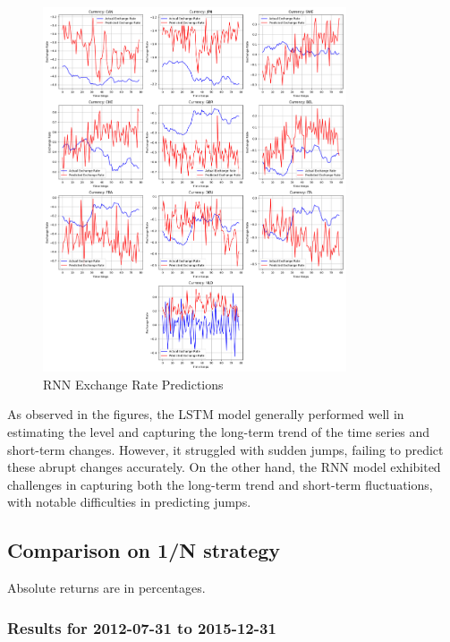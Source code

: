 \documentclass[a4paper,10pt]{article}
\begin{document}
\begin{figure}[ht]
    \centering
    \includegraphics[width=0.8\textwidth]{figure/rnn_exchange_rate_predictions.png}
    \caption{RNN Exchange Rate Predictions}
    \label{figure:rnn_predictions}
\end{figure}

As observed in the figures, the LSTM model generally performed well in estimating the level and capturing the long-term trend of the time series and short-term changes. However, it struggled with sudden jumps, failing to predict these abrupt changes accurately. On the other hand, the RNN model exhibited challenges in capturing both the long-term trend and short-term fluctuations, with notable difficulties in predicting jumps.

\clearpage  %

\subsection{Comparison on 1/N strategy}

Absolute returns are in percentages.

\subsubsection{Results for 2012-07-31 to 2015-12-31}
\end{document}
